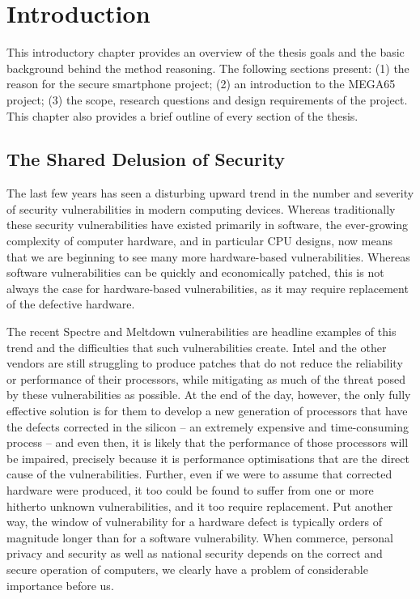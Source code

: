 
\chapter{Introduction} %

\label{Chapter1} %


This introductory chapter provides an overview of the thesis goals and the basic background behind the method reasoning. The following sections present: (1) the reason for the secure smartphone project; (2) an introduction to the MEGA65 project; (3) the scope, research questions and design requirements of the project. This chapter also provides a brief outline of every section of the thesis. 

\section{The Shared Delusion of Security}

	The last few years has seen a disturbing upward trend in the number and severity of security vulnerabilities in modern computing devices. Whereas traditionally these security vulnerabilities have existed primarily in software, the ever-growing complexity of computer hardware, and in particular CPU designs, now means that we are beginning to see many more hardware-based vulnerabilities.  Whereas software vulnerabilities can be quickly and economically patched, this is not always the case for hardware-based vulnerabilities, as it may require replacement of the defective hardware.  

The recent Spectre and Meltdown vulnerabilities are headline examples of this trend and the difficulties that such vulnerabilities create. Intel and the other vendors are still struggling to produce patches that do not reduce the reliability or performance of their processors, while mitigating as much of the threat posed by these vulnerabilities as possible.  At the end of the day, however, the only fully effective solution is for them to develop a new generation of processors that have the defects corrected in the silicon – an extremely expensive and time-consuming process – and even then, it is likely that the performance of those processors will be impaired, precisely because it is performance optimisations that are the direct cause of the vulnerabilities.  Further, even if we were to assume that corrected hardware were produced, it too could be found to suffer from one or more hitherto unknown vulnerabilities, and it too require replacement.  Put another way, the window of vulnerability for a hardware defect is typically orders of magnitude longer than for a software vulnerability. When commerce, personal privacy and security as well as national security depends on the correct and secure operation of computers, we clearly have a problem of considerable importance before us.

